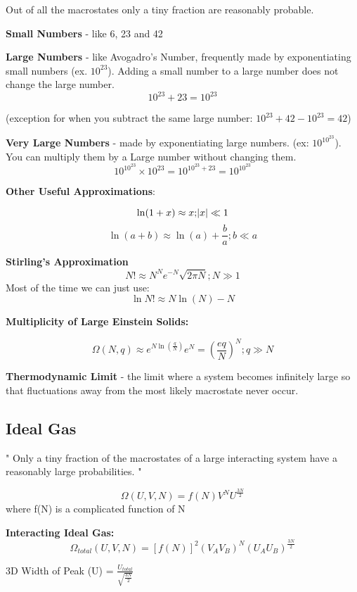  Out of all the macrostates only a tiny fraction are reasonably probable.

\textbf{Small Numbers} - like 6, 23 and 42

\textbf{Large Numbers} - like Avogadro's Number, frequently made by exponentiating small numbers (ex. $10^{23}$). Adding a small number to a large number does not change the large number.\\
\[10^{23} +23 = 10^{23} \]

(exception for when you subtract the same large number: $10^{23} + 42 - 10^{23} = 42$)

\textbf{Very Large Numbers} - made by exponentiating large numbers.
(ex: $10^{10^{23}}$). You can multiply them by a Large number without changing them.
\[10^{10^{23}} \times 10^{23} = 10^{10^{23}+23} =10^{10^{23}} \]

\textbf{Other Useful Approximations}:

\[\ln(1+x) \approx x ; \abs{x} \ll 1\]
\[\ln(a+b) \approx \ln(a) + \frac{b}{a} ; b\ll a \]

\begin{shaded}
\textbf{Stirling's Approximation}
\begin{equation}
N! \approx N^Ne^{-N} \sqrt{2\pi N} ; N \gg 1
\end{equation}
Most of the time we can just use: 
\[\ln{N!} \approx N\ln(N) - N\]
\end{shaded}
\newpage 

\textbf{Multiplicity of Large Einstein Solids:}

\[ \Omega (N,q) \approx e^{N\ln\left(\frac{q}{N}\right)} e^N = \left(\frac{eq}{N}\right)^N ; q \gg N \]

\textbf{Thermodynamic Limit} - the limit where a system becomes infinitely large so that fluctuations away from the most likely macrostate never occur.

\subsection{Ideal Gas}
" Only a tiny fraction of the macrostates of a large interacting system have a reasonably large probabilities. "

\[ \Omega (U,V,N) = f(N) V^N U^{\frac{3N}{2}} \]
where f(N) is a complicated function of N

\textbf{Interacting Ideal Gas:}
\[ \Omega_{total} (U,V,N) = [f(N)]^2 (V_A V_B)^N (U_A U_B)^{\frac{3N}{2}} \]

3D Width of Peak (U) = $\frac{U_{total}}{\sqrt{\frac{3N}{2}}}$

